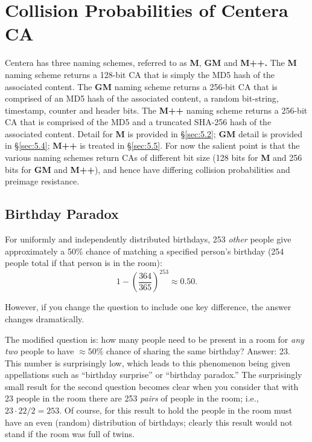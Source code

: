 \section{Collision Probabilities of Centera CA}\label{sec:5}

Centera has three naming schemes, referred to as \textbf{M}, \textbf{GM}
and \textbf{M++.} The \textbf{M} naming scheme returns a 128-bit CA that
is simply the MD5 hash of the associated content. The \textbf{GM} naming
scheme returns a 256-bit CA that is comprised of an MD5 hash of the
associated content, a random bit-string, timestamp, counter and header
bits. The \textbf{M++} naming scheme returns a 256-bit CA that is
comprised of the MD5 and a truncated SHA-256 hash of the associated
content. Detail for \textbf{M} is provided in \S\ref{sec:5.2};
\textbf{GM} detail is provided in \S\ref{sec:5.4}; \textbf{M++}
is treated in \S\ref{sec:5.5}. For now the salient point is that
the various naming schemes return CAs of different bit size (128 bits
for \textbf{M} and 256 bits for \textbf{GM} and \textbf{M++}), and hence
have differing collision probabilities and preimage resistance.

\subsection{Birthday Paradox}\label{sec:5.1}\label{birthday-paradox}

For uniformly and independently distributed birthdays, 253 \emph{other}
people give approximately a 50\% chance of matching a specified person's
birthday (254 people total if that person is in the room):
\begin{equation}\label{eq:5.1}
1-\left(\frac{364}{365}\right)^{253}\approx0.50.
\end{equation}

However, if you change the question to include one key difference, the
answer changes dramatically.

The modified question is: how many people need to be present in a room
for \emph{any two} people to have \(\approx50\%\) chance of sharing the
same birthday? Answer: 23. This number is surprisingly low, which leads
to this phenomenon being given appellations such as ``birthday
surprise'' or ``birthday paradox.'' The surprisingly small result for
the second question becomes clear when you consider that with 23 people
in the room there are 253 \emph{pairs} of people in the room; i.e.,
\(23\cdot22/2=253.\) Of course, for this result to hold the people in
the room must have an even (random) distribution of birthdays; clearly
this result would not stand if the room was full of twins.

